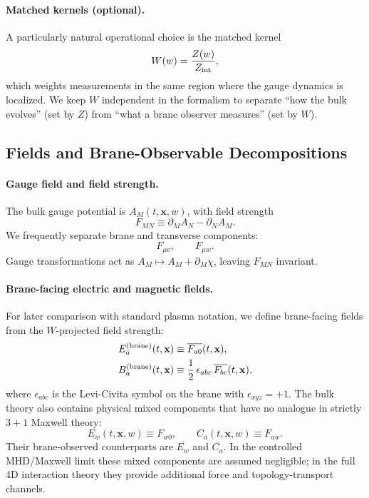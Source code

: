 \documentclass[11pt]{article}
\newcommand{\x}{\mathbf{x}}     %
\newcommand{\Z}{Z}              %
\newcommand{\W}{W}              %
\newcommand{\Proj}[1]{\overline{#1}} %
\newcommand{\Zint}{Z_{\rm int}}
\begin{document}
\paragraph{Matched kernels (optional).}
A particularly natural operational choice is the matched kernel
\begin{equation}
\W(w)=\frac{\Z(w)}{\Zint},
\label{eq:W_matched}
\end{equation}
which weights measurements in the same region where the gauge dynamics is
localized. We keep \(\W\) independent in the formalism to separate ``how the bulk
evolves'' (set by \(\Z\)) from ``what a brane observer measures'' (set by \(\W\)).

\subsection{Fields and Brane-Observable Decompositions}
\label{sec:field_decompositions}

\paragraph{Gauge field and field strength.}
The bulk gauge potential is \(A_M(t,\x,w)\), with field strength
\begin{equation}
F_{MN} \equiv \partial_M A_N - \partial_N A_M.
\label{eq:F_def_conv}
\end{equation}
We frequently separate brane and transverse components:
\begin{equation}
F_{\mu\nu},\qquad F_{\mu w}.
\label{eq:F_split}
\end{equation}
Gauge transformations act as \(A_M\mapsto A_M+\partial_M\chi\), leaving \(F_{MN}\)
invariant.

\paragraph{Brane-facing electric and magnetic fields.}
For later comparison with standard plasma notation, we define brane-facing fields
from the \(\W\)-projected field strength:
\begin{align}
E_a^{\rm (brane)}(t,\x)
&\equiv \Proj{F_{a0}}(t,\x),
\label{eq:E_brane_def}
\\
B_a^{\rm (brane)}(t,\x)
&\equiv \frac12\,\epsilon_{abc}\,\Proj{F_{bc}}(t,\x),
\label{eq:B_brane_def}
\end{align}
where \(\epsilon_{abc}\) is the Levi-Civita symbol on the brane with
\(\epsilon_{xyz}=+1\). The bulk theory also contains physical mixed components
that have no analogue in strictly \(3+1\) Maxwell theory:
\begin{equation}
E_w(t,\x,w)\equiv F_{w0},
\qquad
C_a(t,\x,w)\equiv F_{aw}.
\label{eq:mixed_fields_def}
\end{equation}
Their brane-observed counterparts are \(\Proj{E_w}\) and \(\Proj{C_a}\). In the
controlled MHD/Maxwell limit these mixed components are assumed negligible; in
the full 4D interaction theory they provide additional force and topology-transport
channels.
\end{document}
